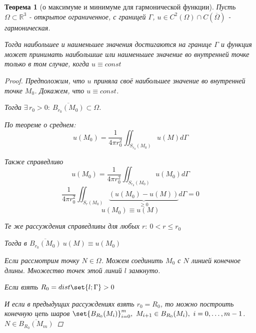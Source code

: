 \documentclass[a4paper]{article}
\DeclarePairedDelimiter\set\{\}
\newtheorem*{theorem}{Теорема}
\theoremstyle{definition}
\theoremstyle{remark}
\begin{document}
\begin{tcolorbox}
    \begin{theorem}[о максимуме и минимуме для гармонической функции]

        Пусть $ \Omega \subset \mathbb{R}^3 $ - открытое ограниченное, с границей
        $ \Gamma $, $ u \in C^2(\Omega) \cap C(\overline{\Omega}) $ - 
        гармоническая.

        Тогда наибольшее и наименьшее значения достигаются на границе $ \Gamma $ 
        и функция может принимать наибольшше или наименьшее значение во внутренней точке
        только в том случае, когда $ u \equiv const $ 

        \begin{proof}
            Предположим, что $ u $ приняла своё наибольшее значение во внутренней точке
            $ M_0 $. Докажем, что $ u \equiv const $.

            Тогда $ \exists\, r_0 > 0: \ \overline{B_{r_0}(M_0)} \subset \Omega $.

            По теореме о среднем:
            \[
                u(M_0) = \frac{1}{4\pi r_0^2} \iint_{S_{r_0}(M_0)} u(M) d \Gamma
            \]

            Также справедливо
            \[
                u(M_0) = \frac{1}{4\pi r_0^2} \iint_{S_{r_0}(M_0)} u(M_0) d \Gamma
            \]
            \[
                \frac{1}{4\pi r_0^2} \iint_{S_r(M_0)}\underbrace{(u(M_0) - u(M))}_{\geq 0}
                d \Gamma = 0
            \]
            \[
                u(M_0) \equiv u(M)
            \]

            Те же рассуждения справедливы для любых $ r: \ 0 < r \leq r_0 $ 

            Тогда в $ \overline{B_{r_0}(M_0)} \ u(M) \equiv u(M_0)$ 

            Если рассмотрим точку $ N \in \Omega $. Можем соединить $ M_0 $ с
            $ N $ линией конечное длины. Множество точек этой линий $ l $ замкнуто.

            Если взять $ R_0 = dist \set{l; \Gamma} > 0 $ 

            И если в предыдущих рассуждениях взять $ r_0 = R_0 $, то можно построить
            конечную цепь шаров $ \set{B_{R_0}(M_i)}_{i=0}^{m}, \ M_{i+1} \in
            B_{R_0}(M_i), \ i = 0, \dots, m-1$. $ N \in \overline{B_{R_0}(M_m)} $  
        \end{proof}
    \end{theorem}
\end{tcolorbox}
\end{document}
